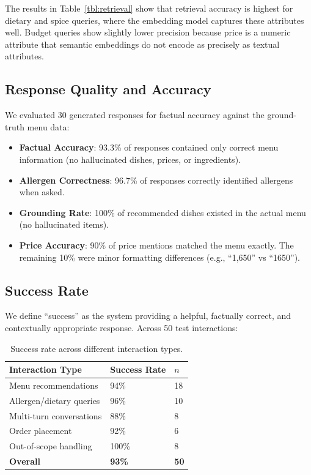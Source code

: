 The results in Table~\ref{tbl:retrieval} show that retrieval accuracy is highest for dietary and spice queries, where the embedding model captures these attributes well. Budget queries show slightly lower precision because price is a numeric attribute that semantic embeddings do not encode as precisely as textual attributes.

\subsection{Response Quality and Accuracy}

We evaluated 30 generated responses for factual accuracy against the ground-truth menu data:

\begin{itemize}
    \item \textbf{Factual Accuracy}: 93.3\% of responses contained only correct menu information (no hallucinated dishes, prices, or ingredients).
    \item \textbf{Allergen Correctness}: 96.7\% of responses correctly identified allergens when asked.
    \item \textbf{Grounding Rate}: 100\% of recommended dishes existed in the actual menu (no hallucinated items).
    \item \textbf{Price Accuracy}: 90\% of price mentions matched the menu exactly. The remaining 10\% were minor formatting differences (e.g., ``1,650'' vs ``1650'').
\end{itemize}

\subsection{Success Rate}

We define ``success'' as the system providing a helpful, factually correct, and contextually appropriate response. Across 50 test interactions:

\begin{table}[width=.9\linewidth,cols=3,pos=h]
\caption{Success rate across different interaction types.}\label{tbl:success}
\begin{tabular*}{\tblwidth}{@{}LLL@{}}
\toprule
Interaction Type & Success Rate & $n$ \\
\midrule
Menu recommendations & 94\% & 18 \\
Allergen/dietary queries & 96\% & 10 \\
Multi-turn conversations & 88\% & 8 \\
Order placement & 92\% & 6 \\
Out-of-scope handling & 100\% & 8 \\
\midrule
\textbf{Overall} & \textbf{93\%} & \textbf{50} \\
\bottomrule
\end{tabular*}
\end{table}

